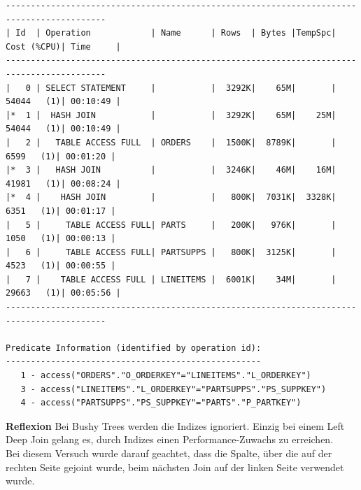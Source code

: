 \documentclass[10pt]{article}
\begin{document}
\begin{lstlisting}[style=queryexecutionplan]
------------------------------------------------------------------------------------------
| Id  | Operation            | Name      | Rows  | Bytes |TempSpc| Cost (%CPU)| Time     |
------------------------------------------------------------------------------------------
|   0 | SELECT STATEMENT     |           |  3292K|    65M|       | 54044   (1)| 00:10:49 |
|*  1 |  HASH JOIN           |           |  3292K|    65M|    25M| 54044   (1)| 00:10:49 |
|   2 |   TABLE ACCESS FULL  | ORDERS    |  1500K|  8789K|       |  6599   (1)| 00:01:20 |
|*  3 |   HASH JOIN          |           |  3246K|    46M|    16M| 41981   (1)| 00:08:24 |
|*  4 |    HASH JOIN         |           |   800K|  7031K|  3328K|  6351   (1)| 00:01:17 |
|   5 |     TABLE ACCESS FULL| PARTS     |   200K|   976K|       |  1050   (1)| 00:00:13 |
|   6 |     TABLE ACCESS FULL| PARTSUPPS |   800K|  3125K|       |  4523   (1)| 00:00:55 |
|   7 |    TABLE ACCESS FULL | LINEITEMS |  6001K|    34M|       | 29663   (1)| 00:05:56 |
------------------------------------------------------------------------------------------
 
Predicate Information (identified by operation id):
---------------------------------------------------
   1 - access("ORDERS"."O_ORDERKEY"="LINEITEMS"."L_ORDERKEY")
   3 - access("LINEITEMS"."L_ORDERKEY"="PARTSUPPS"."PS_SUPPKEY")
   4 - access("PARTSUPPS"."PS_SUPPKEY"="PARTS"."P_PARTKEY")
\end{lstlisting}
\textbf{Reflexion} \newline
Bei Bushy Trees werden die Indizes ignoriert. Einzig bei einem Left Deep Join gelang es, durch Indizes einen Performance-Zuwachs zu erreichen.\\
Bei diesem Versuch wurde darauf geachtet, dass die Spalte, über die auf der rechten Seite gejoint wurde, beim nächsten Join auf der linken Seite verwendet wurde.

\newpage
\end{document}
